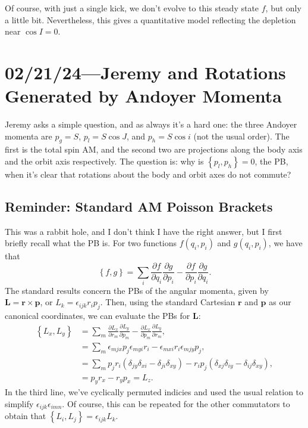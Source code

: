 \documentclass[12pt]{article}
\newcommand*{\pd}[2]{\frac{\partial#1}{\partial#2}}
\newcommand*{\bm}[1]{\boldsymbol{\mathbf{#1}}}
\newcommand*{\p}[1]{\left(#1\right)}
\newcommand*{\z}[1]{\left\{#1\right\}}
\begin{document}
Of course, with just a single kick, we don't evolve to this steady state $f$,
but only a little bit. Nevertheless, this gives a quantitative model reflecting
the depletion near $\cos I = 0$.

\section{02/21/24---Jeremy and Rotations Generated by Andoyer Momenta}

Jeremy asks a simple question, and as always it's a hard one: the three Andoyer
momenta are $p_g=S$, $p_l=S\cos J$, and $p_h=S \cos i$ (not the usual order).
The first is the total spin AM, and the second two are projections along the
body axis and the orbit axis respectively. The question is: why is $\z{p_l, p_h}
= 0$, the PB, when it's clear that rotations about the body and orbit axes do
not commute?

\subsection{Reminder: Standard AM Poisson Brackets}

This was a rabbit hole, and I don't think I have the right answer, but I first
briefly recall what the PB is. For two functions $f\p{q_i, p_i}$ and $g\p{q_i,
p_i}$, we have that
\begin{equation}
    \z{f, g}
        = \sum\limits_i \pd{f}{q_i}\pd{g}{p_i}
            - \pd{f}{p_i}\pd{g}{q_i}.
\end{equation}
The standard results concern the PBs of the angular momenta, given by $\bm{L} =
\bm{r} \times \bm{p}$, or $L_k = \epsilon_{ijk}r_ip_j$. Then, using the standard
Cartesian $\bm{r}$ and $\bm{p}$ as our canonical coordinates, we can evaluate
the PBs for $\bm{L}$:
\begin{align*}
    \z{L_x, L_y}
        &= \sum\limits_m \pd{L_x}{r_m}\pd{L_y}{p_m}
            - \pd{L_x}{p_m}\pd{L_y}{r_m},\\
        &= \sum\limits_m
            \epsilon_{mjx}p_j \epsilon_{myi}r_i
                - \epsilon_{mxi}r_i \epsilon_{mjy}p_j,\\
        &= \sum\limits_m p_jr_i\p{\delta_{jy}\delta_{xi}
            - \delta_{ji}\delta_{xy}}
            - r_ip_j\p{\delta_{xj}\delta_{iy}
                - \delta_{ij}\delta_{xy}},\\
        &= p_yr_x - r_yp_x = L_z.
\end{align*}
In the third line, we've cyclically permuted indicies and used the usual
relation to simplify $\epsilon_{ijk}\epsilon_{imn}$. Of course, this can be
repeated for the other commutators to obtain that $\z{L_i, L_j} =
\epsilon_{ijk}L_k$.
\end{document}
